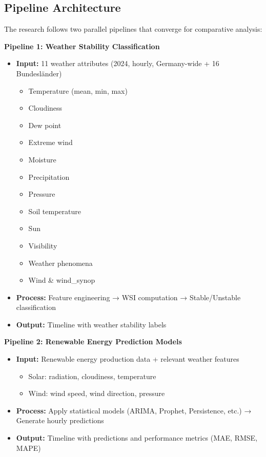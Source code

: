 \documentclass[11pt,a4paper]{article}
\begin{document}
\subsection{Pipeline Architecture}

The research follows two parallel pipelines that converge for comparative analysis:

\textbf{Pipeline 1: Weather Stability Classification}
\begin{itemize}
    \item \textbf{Input:} 11 weather attributes (2024, hourly, Germany-wide + 16 Bundesländer)
    \begin{itemize}
        \item Temperature (mean, min, max)
        \item Cloudiness
        \item Dew point
        \item Extreme wind
        \item Moisture
        \item Precipitation
        \item Pressure
        \item Soil temperature
        \item Sun
        \item Visibility
        \item Weather phenomena
        \item Wind \& wind\_synop
    \end{itemize}
    \item \textbf{Process:} Feature engineering → WSI computation → Stable/Unstable classification
    \item \textbf{Output:} Timeline with weather stability labels
\end{itemize}

\textbf{Pipeline 2: Renewable Energy Prediction Models}
\begin{itemize}
    \item \textbf{Input:} Renewable energy production data + relevant weather features
    \begin{itemize}
        \item Solar: radiation, cloudiness, temperature
        \item Wind: wind speed, wind direction, pressure
    \end{itemize}
    \item \textbf{Process:} Apply statistical models (ARIMA, Prophet, Persistence, etc.) → Generate hourly predictions
    \item \textbf{Output:} Timeline with predictions and performance metrics (MAE, RMSE, MAPE)
\end{itemize}
\end{document}
